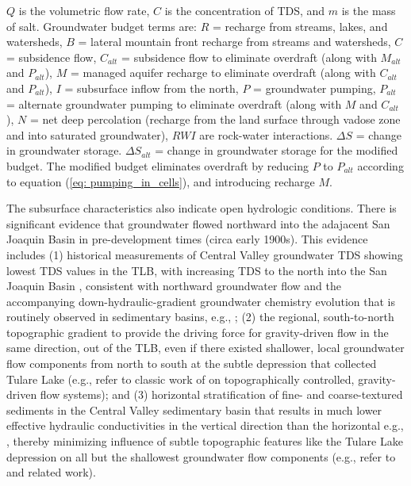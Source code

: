 \begin{threeparttable}
\begin{table}[H]
		
		$Q$ is the volumetric flow rate, $C$ is the concentration of TDS, and $m$ is the mass of salt. Groundwater budget terms are:
		$R$ = recharge from streams, lakes, and watersheds, 
		$B$ = lateral mountain front recharge from streams and watersheds,
		$C$ = subsidence flow,
		$C_{alt}$ = subsidence flow to eliminate overdraft (along with $M_{alt}$ and $P_{alt}$),
		$M$ = managed aquifer recharge to eliminate overdraft (along with $C_{alt}$ and $P_{alt}$), 
		$I$ = subsurface inflow from the north,
		$P$ = groundwater pumping,
		$P_{alt}$ = alternate groundwater pumping to eliminate overdraft (along with $M$ and $C_{alt}$),
		$N$ = net deep percolation (recharge from the land surface through vadose zone and into saturated groundwater),
		$RWI$ are rock-water interactions.
		$\Delta S$ = change in groundwater storage.
		$\Delta S_{alt}$ = change in groundwater storage for the modified budget. 
		The modified budget eliminates overdraft by reducing $P$ to $P_{alt}$ according to equation (\ref{eq: pumping_in_cells}), and introducing recharge $M$. 
		
	\end{table}
	
\end{threeparttable}

\egroup

\clearpage


The subsurface characteristics also indicate open hydrologic conditions. There is significant evidence that groundwater flowed northward into the adajacent San Joaquin Basin in pre-development times (circa early 1900s). This evidence includes (1) historical measurements of Central Valley groundwater TDS showing lowest TDS values in the TLB, with increasing TDS to the north into the San Joaquin Basin \citep[Table 23]{mendenhall1916ground}, consistent with northward groundwater flow and the accompanying down-hydraulic-gradient groundwater chemistry evolution that is routinely observed in sedimentary basins, e.g., \citep{palmer1984geochemical}; (2) the regional, south-to-north topographic gradient to provide the driving force for gravity-driven flow in the same direction, out of the TLB, even if there existed shallower, local groundwater flow components from north to south at the subtle depression that collected Tulare Lake (e.g., refer to classic work of \cite{toth1970conceptual} on topographically controlled, gravity-driven flow systems); and (3) horizontal stratification of fine- and coarse-textured sediments in the Central Valley sedimentary basin that results in much lower effective hydraulic conductivities in the vertical direction than the horizontal e.g., \citep{weissmann2002dispersion, Faunted.2009}, thereby minimizing influence of subtle topographic features like the Tulare Lake depression on all but the shallowest groundwater flow components (e.g., refer to \cite{toth1970conceptual} and related work).

